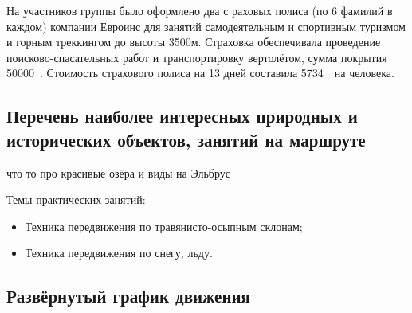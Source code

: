 На участников группы было оформлено два с раховых полиса (по 6 фамилий в каждом) компании Евроинс для
занятий самодеятельным и спортивным туризмом и горным треккингом до высоты 3500м. Страховка обеспечивала проведение поисково-спасательных работ и транспортировку вертолётом, сумма покрытия 50000~\faEur. Стоимость страхового полиса на 13 дней составила 5734~\faRub~на человека.





\subsection{Перечень наиболее интересных природных и исторических объектов, занятий на маршруте}
что то про красивые озёра и виды на Эльбрус

Темы практических занятий:
\begin{itemize}
	\item Техника передвижения по травянисто-осыпным склонам;
	\item Техника передвижения по снегу, льду.
\end{itemize}




\newpage
\subsection{Развёрнутый график движения}

